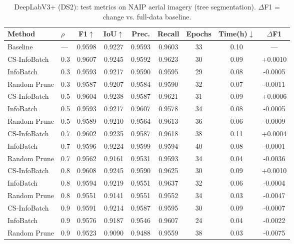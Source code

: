 \begin{table}[ht]
\centering
\small
\caption{DeepLabV3+ (DS2): test metrics on NAIP aerial imagery (tree segmentation). $\Delta$F1 = change vs. full-data baseline.}
\label{tab:main_results_deeplabv3plus_(ds2)}
\begin{tabular}{llccccccc}
\toprule
Method & $\rho$ & F1$\uparrow$ & IoU$\uparrow$ & Prec. & Recall & Epochs & Time(h)$\downarrow$ & $\Delta$F1 \\
\midrule
Baseline & --- & 0.9598 & 0.9227 & 0.9593 & 0.9603 & 33 & 0.10 & --- \\
\midrule
CS-InfoBatch & 0.3 & 0.9607 & 0.9245 & 0.9592 & 0.9623 & 30 & 0.09 & +0.0010 \\
InfoBatch & 0.3 & 0.9593 & 0.9217 & 0.9590 & 0.9595 & 29 & 0.08 & -0.0005 \\
Random Prune & 0.3 & 0.9587 & 0.9207 & 0.9584 & 0.9590 & 32 & 0.07 & -0.0011 \\
\midrule
CS-InfoBatch & 0.5 & 0.9604 & 0.9238 & 0.9587 & 0.9621 & 31 & 0.09 & +0.0006 \\
InfoBatch & 0.5 & 0.9593 & 0.9217 & 0.9607 & 0.9578 & 34 & 0.08 & -0.0005 \\
Random Prune & 0.5 & 0.9589 & 0.9210 & 0.9564 & 0.9613 & 36 & 0.06 & -0.0009 \\
\midrule
CS-InfoBatch & 0.7 & 0.9602 & 0.9235 & 0.9587 & 0.9618 & 38 & 0.11 & +0.0004 \\
InfoBatch & 0.7 & 0.9596 & 0.9224 & 0.9599 & 0.9594 & 40 & 0.08 & -0.0001 \\
Random Prune & 0.7 & 0.9562 & 0.9161 & 0.9531 & 0.9593 & 34 & 0.04 & -0.0036 \\
\midrule
CS-InfoBatch & 0.8 & 0.9608 & 0.9245 & 0.9590 & 0.9625 & 30 & 0.09 & +0.0010 \\
InfoBatch & 0.8 & 0.9594 & 0.9219 & 0.9551 & 0.9637 & 32 & 0.06 & -0.0004 \\
Random Prune & 0.8 & 0.9551 & 0.9141 & 0.9551 & 0.9552 & 34 & 0.03 & -0.0047 \\
\midrule
CS-InfoBatch & 0.9 & 0.9591 & 0.9214 & 0.9587 & 0.9595 & 30 & 0.09 & -0.0007 \\
InfoBatch & 0.9 & 0.9576 & 0.9187 & 0.9546 & 0.9607 & 24 & 0.04 & -0.0022 \\
Random Prune & 0.9 & 0.9523 & 0.9090 & 0.9488 & 0.9559 & 38 & 0.03 & -0.0075 \\
\bottomrule
\end{tabular}
\end{table}